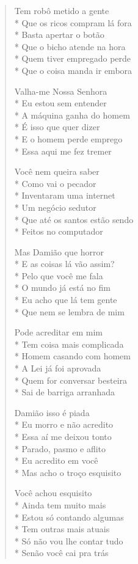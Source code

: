 \begin{verse}
Tem robô metido a gente\\*
Que os ricos compram lá fora\\*
Basta apertar o botão\\*
Que o bicho atende na hora\\*
Quem tiver empregado perde\\*
Que o coisa manda ir embora

Valha-me Nossa Senhora\\*
Eu estou sem entender\\*
A máquina ganha do homem\\*
É isso que quer dizer\\*
E o homem perde emprego\\*
Essa aqui me fez tremer

Você nem queira saber\\*
Como vai o pecador\\*
Inventaram uma internet\\*
Um negócio sedutor\\*
Que até os santos estão sendo\\*
Feitos no computador

Mas Damião que horror\\*
E as coisas lá vão assim?\\*
Pelo que você me fala\\*
O mundo já está no fim\\*
Eu acho que lá tem gente\\*
Que nem se lembra de mim

Pode acreditar em mim\\*
Tem coisa mais complicada\\*
Homem casando com homem\\*
A Lei já foi aprovada\\*
Quem for conversar besteira\\*
Sai de barriga arranhada

Damião isso é piada\\*
Eu morro e não acredito\\*
Essa aí me deixou tonto\\*
Parado, pasmo e aflito\\*
Eu acredito em você\\*
Mas acho o troço esquisito

Você achou esquisito\\*
Ainda tem muito mais\\*
Estou só contando algumas\\*
Tem outras mais atuais\\*
Só não vou lhe contar tudo\\*
Senão você cai pra trás


\end{verse}
